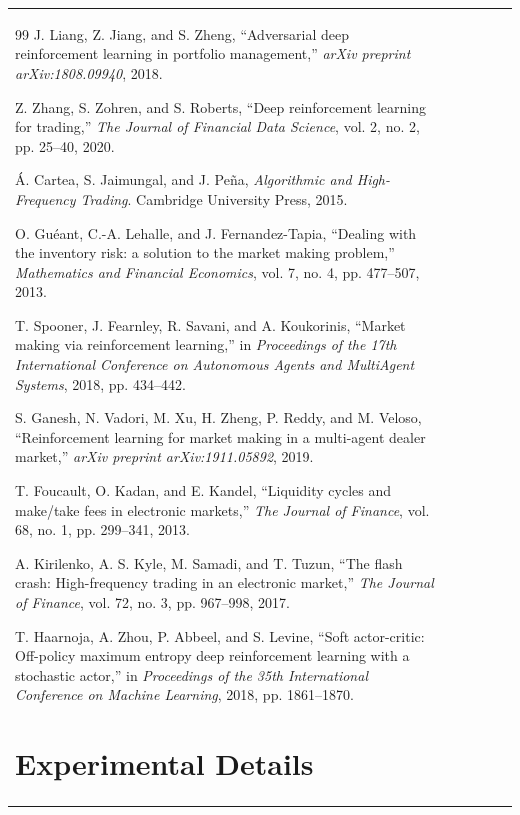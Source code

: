 \documentclass[11pt,a4paper]{article}
\begin{document}
\begin{table}[h]
\begin{tabular}{|l|c|c|c|c|c|}
\begin{thebibliography}{99}
\bibitem{liang2018adversarial}
J. Liang, Z. Jiang, and S. Zheng, ``Adversarial deep reinforcement learning in portfolio management,'' \emph{arXiv preprint arXiv:1808.09940}, 2018.

\bibitem{zhang2020deep}
Z. Zhang, S. Zohren, and S. Roberts, ``Deep reinforcement learning for trading,'' \emph{The Journal of Financial Data Science}, vol. 2, no. 2, pp. 25--40, 2020.

\bibitem{cartea2015algorithmic}
{\'{A}}. Cartea, S. Jaimungal, and J. Pe{\~{n}}a, \emph{Algorithmic and High-Frequency Trading}. Cambridge University Press, 2015.

\bibitem{guant2013dealing}
O. Gu{\'{e}}ant, C.-A. Lehalle, and J. Fernandez-Tapia, ``Dealing with the inventory risk: a solution to the market making problem,'' \emph{Mathematics and Financial Economics}, vol. 7, no. 4, pp. 477--507, 2013.

\bibitem{spooner2018market}
T. Spooner, J. Fearnley, R. Savani, and A. Koukorinis, ``Market making via reinforcement learning,'' in \emph{Proceedings of the 17th International Conference on Autonomous Agents and MultiAgent Systems}, 2018, pp. 434--442.

\bibitem{ganesh2019reinforcement}
S. Ganesh, N. Vadori, M. Xu, H. Zheng, P. Reddy, and M. Veloso, ``Reinforcement learning for market making in a multi-agent dealer market,'' \emph{arXiv preprint arXiv:1911.05892}, 2019.

\bibitem{foucault2013market}
T. Foucault, O. Kadan, and E. Kandel, ``Liquidity cycles and make/take fees in electronic markets,'' \emph{The Journal of Finance}, vol. 68, no. 1, pp. 299--341, 2013.

\bibitem{kirilenko2017flash}
A. Kirilenko, A. S. Kyle, M. Samadi, and T. Tuzun, ``The flash crash: High-frequency trading in an electronic market,'' \emph{The Journal of Finance}, vol. 72, no. 3, pp. 967--998, 2017.

\bibitem{haarnoja2018soft}
T. Haarnoja, A. Zhou, P. Abbeel, and S. Levine, ``Soft actor-critic: Off-policy maximum entropy deep reinforcement learning with a stochastic actor,'' in \emph{Proceedings of the 35th International Conference on Machine Learning}, 2018, pp. 1861--1870.

\end{thebibliography}
\n\n
\appendix

\section{Experimental Details}


\end{tabular}
\end{table}
\end{document}
